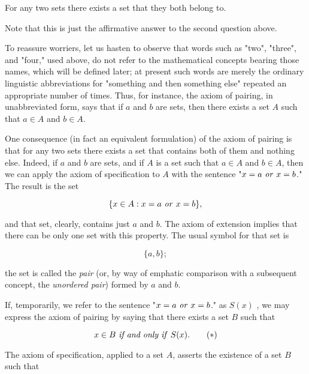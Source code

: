 \begin{named}  For any two sets there exists a set that they both belong to.
\end{named}


Note that this is just the affirmative answer to the second question above.

To reassure worriers, let us hasten to observe that words such as "two", "three", and "four," used above, do not refer to the mathematical concepts bearing those names, which will be defined later; at present such words are merely the ordinary linguistic abbreviations for "something and then something else" repeated an appropriate number of times. Thus, for instance, the axiom of pairing, in unabbreviated form, says that if $a$ and $b$ are sets, then there exists a set $A$ such that $a \in A$ and $b \in A$.

One consequence (in fact an equivalent formulation) of the axiom of pairing is that for any two sets there exists a set that contains both of them and nothing else. Indeed, if $a$ and $b$ are sets, and if $A$ is a set such that $a \in A$ and $b \in A$, then we can apply the axiom of specification to $A$ with the sentence "$x = a \text{ \textit{or} } x = b$." The result is the set 

\begin{equation*}
\{ x \in A: x = a \text{ \textit{or} } x = b \},
\end{equation*}

and that set, clearly, contains just $a$ and $b$. The axiom of extension implies that there can be only one set with this property. The usual symbol for that set is

\begin{equation*}
\{ a, b \};
\end{equation*}

the set is called the \textit{pair} (or, by way of emphatic comparison with a subsequent concept, the \textit{unordered pair}) formed by $a$ and $b$. 

If, temporarily, we refer to the sentence "$x = a \text{ \textit{or} } x = b$." as $S(x)$ , we may express the axiom of pairing by saying that there exists a set $B$ such that 

\begin{equation}
\label{eq3.1}
x \in B \text{ \textit{if and only if} } S(x). \tag{$\ast$}
\end{equation}

The axiom of specification, applied to a set $A$, asserts the existence of a set $B$ such that 

